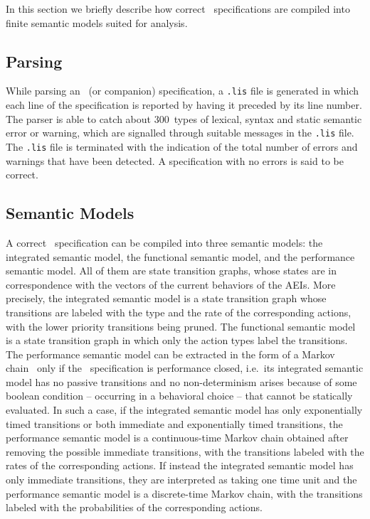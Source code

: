In this section we briefly describe how correct \aemilia\ specifications are compiled into finite semantic
models suited for analysis.


\subsection{Parsing}

While parsing an \aemilia\ (or companion) specification, a {\tt .lis} file is generated in which each line
of the specification is reported by having it preceded by its line number. The parser is able to catch about
300~types of lexical, syntax and static semantic error or warning, which are signalled through suitable
messages in the {\tt .lis} file. The {\tt .lis} file is terminated with the indication of the total number
of errors and warnings that have been detected. A specification with no errors is said to be correct.


\subsection{Semantic Models}

A correct \aemilia\ specification can be compiled into three semantic models: the integrated semantic model,
the functional semantic model, and the performance semantic model. All of them are state transition graphs,
whose states are in correspondence with the vectors of the current behaviors of the AEIs. More precisely,
the integrated semantic model is a state transition graph whose transitions are labeled with the type and
the rate of the corresponding actions, with the lower priority transitions being pruned. The functional
semantic model is a state transition graph in which only the action types label the transitions. The
performance semantic model can be extracted in the form of a Markov chain~\cite{Ste1} only if the \aemilia\
specification is performance closed, i.e.\ its integrated semantic model has no passive transitions and no
non-determinism arises because of some boolean condition -- occurring in a behavioral choice -- that cannot
be statically evaluated. In such a case, if the integrated semantic model has only exponentially timed
transitions or both immediate and exponentially timed transitions, the performance semantic model is a
continuous-time Markov chain obtained after removing the possible immediate transitions, with the
transitions labeled with the rates of the corresponding actions. If instead the integrated semantic model
has only immediate transitions, they are interpreted as taking one time unit and the performance semantic
model is a discrete-time Markov chain, with the transitions labeled with the probabilities of the
corresponding actions.

